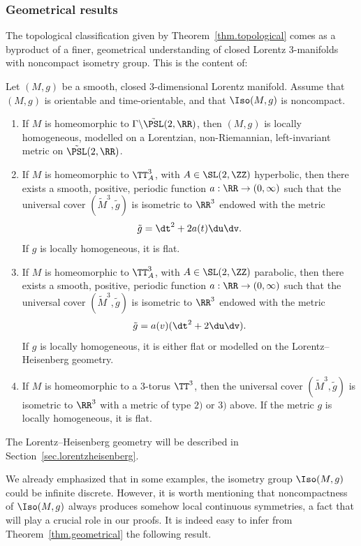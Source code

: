 \subsubsection{Geometrical results}
The topological classification given by Theorem~\ref{thm.topological} comes as a byproduct of a finer, geometrical understanding of closed Lorentz $3$-manifolds with noncompact isometry group. This is the content of:

\begin{thmx}\label{thm.geometrical}
Let $(M,g)$ be a smooth, closed $3$-dimensional Lorentz manifold. Assume that $(M,g)$ is orientable and time-orientable, and that $\Iso(M,g)$ is noncompact.
\begin{enumerate}
\item \label{list3.1}If $M$ is homeomorphic to $\Gamma \backslash
\tilde{\PSL}(2,\RR)$, then $(M,g)$ is locally homogeneous, modelled on a Lorentzian, non-Riemannian, left-invariant metric on $\tilde{\PSL}(2,\RR)$.
\item \label{list3.2}If $M$ is homeomorphic to $\TT_A^3$, with $A \in \SL(2,\ZZ)$ hyperbolic, then there exists a smooth, positive, periodic function $a:\RR \to (0,\infty)$ such that the universal cover $(\tilde{M}^3,{\tilde{g}})$ is isometric to $\RR^3$ endowed with the metric
\[
{\tilde{g}}=\dt^2+2a(t)\du\dv.
\]
If $g$ is locally homogeneous, it is flat.
\item \label{list3.3}If $M$ is homeomorphic to $\TT_A^3$, with $A \in \SL(2,\ZZ)$ parabolic, then there exists a smooth, positive, periodic function $a:\RR \to (0,\infty)$ such that the universal cover $(\tilde{M}^3,{\tilde{g}})$ is isometric to $\RR^3$ endowed with the metric
\[
{\tilde{g}}=a(v)(\dt^2+2\du\dv).
\]
If $g$ is locally homogeneous, it is either flat or modelled on the Lorentz--Heisenberg geometry.
\item \label{list3.4}If $M$ is homeomorphic to a $3$-torus $\TT^3$, then the universal cover $(\tilde{M}^3,{\tilde{g}})$ is isometric to $\RR^3$ with a metric of type $2)$ or $3)$ above. If the metric $g$ is locally homogeneous, it is flat.
\end{enumerate}
\end{thmx}

The Lorentz--Heisenberg geometry will be described in Section~\ref{sec.lorentzheisenberg}.


We already emphasized that in some examples, the isometry group $\Iso(M,g)$ could be infinite discrete. However, it is worth mentioning that noncompactness of $\Iso(M,g)$ always produces somehow local continuous symmetries, a fact that will play a crucial role in our proofs. It is indeed easy to infer from Theorem~\ref{thm.geometrical} the following result.

